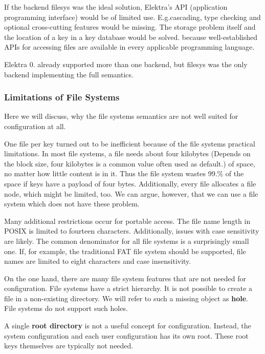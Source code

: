 If the backend {\ttfamily filesys} was the ideal solution, Elektra’s A\+PI (application programming interface) would be of limited use. E.\+g.\+cascading, type checking and optional cross-\/cutting features would be missing. The storage problem itself and the location of a key in a key database would be solved. because well-\/established A\+P\+Is for accessing files are available in every applicable programming language.

Elektra 0. already supported more than one backend, but {\ttfamily filesys} was the only backend implementing the full semantics.

\subsubsection*{Limitations of File Systems}

Here we will discuss, why the file system\textquotesingle{}s semantics are not well suited for configuration at all.

One file per key turned out to be inefficient because of the file system\textquotesingle{}s practical limitations. In most file systems, a file needs about four kilobytes (Depends on the block size, four kilobytes is a common value often used as default.) of space, no matter how little content is in it. Thus the file system wastes 99.\% of the space if keys have a payload of four bytes. Additionally, every file allocates a file node, which might be limited, too. We can argue, however, that we can use a file system which does not have these problem.

Many additional restrictions occur for portable access. The file name length in P\+O\+S\+IX is limited to fourteen characters. Additionally, issues with case sensitivity are likely. The common denominator for all file systems is a surprisingly small one. If, for example, the traditional F\+AT file system should be supported, file names are limited to eight characters and case insensitivity.

On the one hand, there are many file system features that are not needed for configuration. File systems have a strict hierarchy. It is not possible to create a file in a non-\/existing directory. We will refer to such a missing object as {\bfseries hole}. File systems do not support such holes.

A single {\bfseries root directory} is not a useful concept for configuration. Instead, the system configuration and each user configuration has its own root. These root keys themselves are typically not needed.

